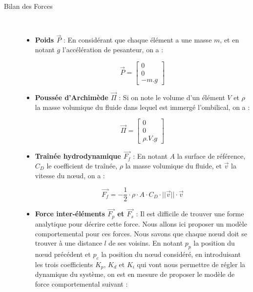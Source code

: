 				\begin{description}
					\item [Bilan des Forces] \
					\begin{itemize}
						\item[\textbullet] \textbf{Poids $\overrightarrow{P}$} : En considérant que chaque élément a une masse $m$, et en notant $g$ l'accélération de pesanteur, on a : 
						
						\begin{equation}
							\overrightarrow{P} = \begin{bmatrix}0\\ 0\\ -m.g\end{bmatrix}
							\label{eq:poids}
						\end{equation}
				
						\item[\textbullet] \textbf{Poussée d'Archimède $\overrightarrow{\Pi}$} : Si on note le volume d'un élément $V$ et $\rho$ la masse volumique du fluide dans lequel est immergé l'ombilical, on a : 
						
						\begin{equation}
							\overrightarrow{\Pi} = \begin{bmatrix}0\\ 0\\ \rho.V.g\end{bmatrix}
							\label{eq:archimede}
						\end{equation}
				
						\item[\textbullet] \textbf{Traînée hydrodynamique $\overrightarrow{F_f}$} : En notant $A$ la surface de référence, $C_D$ le coefficient de traînée, $\rho$ la masse volumique du fluide, et $\overrightarrow{v}$ la vitesse du n\oe ud, on a : 
					
						\begin{equation}
							\overrightarrow{F_f} = - \frac{1}{2} \cdot \rho \cdot A \cdot C_D \cdot ||\overrightarrow{v}|| \cdot \overrightarrow{v}
							\label{eq:drag}
						\end{equation}
						
						\item[\textbullet] \textbf{Force inter-éléments $\overrightarrow{F_p}$ et $\overrightarrow{F_s}$} : Il est difficile de trouver une forme analytique pour décrire cette force. Nous allons ici proposer un modèle comportemental pour ces forces. Nous savons que chaque n\oe ud doit se trouver à une distance $l$ de ses voisins. En notant $p_{p}$ la position du n\oe ud précédent et $p_{c}$ la position du n\oe ud considéré, en introduisant les trois coefficients $K_p$, $K_d$ et $K_i$ qui vont nous permettre de régler la dynamique du système, on est en mesure de proposer le modèle de force comportemental suivant :
						

\end{itemize}
\end{description}
